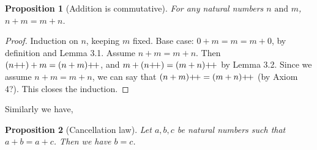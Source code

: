 \documentclass[12pt]{article}
\newtheorem{proposition}{Proposition}[section]
\theoremstyle{remark}
\begin{document}
\begin{proposition}[Addition is commutative]
	For any natural numbers $ n \text{ and } m $, $ n+m = m+n $.
\end{proposition}

\begin{proof}
    Induction on $ n $, keeping $ m $ fixed. Base case: $ 0+m = m = m+0 $, by definition and Lemma 3.1. Assume $ n+m = m+n $. Then $ (n\inc) + m = (n+m)\inc $, and $ m+(n\inc) = (m+n)\inc $ by Lemma 3.2. Since we assume $n+m = m+n$, we can say that $ (n+m)\inc = (m+n)\inc $ (by Axiom 4?). This closes the induction.
\end{proof}

Similarly we have, 

\begin{proposition}[Cancellation law]
    Let $ a, b, c $ be natural numbers such that $ a+b=a+c $. Then we have $ b=c $.
\end{proposition}
\end{document}

